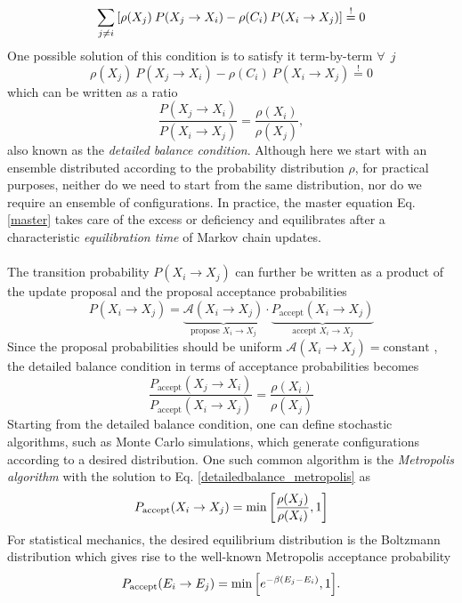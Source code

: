 \documentclass[../thesis_main.tex]{subfiles}
\begin{document}
\begin{equation}
    \sum_{j\neq i} \qty[\rho(X_j) \: P(X_j \to X_i) - \rho(C_i) \: P(X_i \to X_j)] \stackrel{!}{=} 0
\end{equation}  
One possible solution of this condition is to satisfy it term-by-term $\forall \: \: j$ 
\begin{equation}
    \rho(X_j) \: P(X_j \to X_i) - \rho(C_i) \: P(X_i \to X_j) \stackrel{!}{=} 0
\end{equation}
which can be written as a ratio 
\begin{equation}
    \frac{P(X_j \to X_i)}{P(X_i \to X_j)} = \frac{\rho(X_i)}{\rho(X_j)},
    \label{detailedbalance}
\end{equation}
also known as the \textit{detailed balance condition}. Although here we start with an ensemble distributed according to the probability distribution $\rho$, for practical purposes, neither do we need to start from the same distribution, nor do we require an ensemble of configurations. In practice, the master equation Eq. \eqref{master} takes care of the excess or deficiency and equilibrates after a characteristic \textit{equilibration time} of Markov chain updates.~\\~\\
The transition probability $P(X_i \to X_j)$ can further be written as a product of the update proposal and the proposal acceptance probabilities 
\begin{equation}
    P(X_i \to X_j) = \underbrace{\mathcal{A}(X_i \to X_j)}_{\text{propose }X_i \to X_j} \cdot \underbrace{P_\text{accept}(X_i \to X_j)}_{\text{accept }X_i \to X_j}
\end{equation}
Since the proposal probabilities should be uniform $\mathcal{A}(X_i \to X_j) = \text{constant}$ , the detailed balance condition in terms of acceptance probabilities becomes 
\begin{equation}
    \frac{P_\text{accept}(X_j \to X_i)}{P_\text{accept} (X_i \to X_j)} = \frac{\rho(X_i)}{\rho(X_j)}
    \label{detailedbalance_metropolis}
\end{equation}
Starting from the detailed balance condition, one can define stochastic algorithms, such as Monte Carlo simulations, which generate configurations according to a desired distribution. One such common algorithm is the \textit{Metropolis algorithm} with the solution to Eq. \eqref{detailedbalance_metropolis} as 
\begin{equation}
    P_\text{accept}(X_i \to X_j) = \min \qty[\frac{\rho(X_j)}{\rho(X_i)}, 1]
\end{equation}
For statistical mechanics, the desired equilibrium distribution is the Boltzmann distribution which gives rise to the well-known Metropolis acceptance probability
\begin{equation}
    P_\text{accept}(E_i \to E_j) = \min \qty[e^{-\beta(E_j - E_i)}, 1]. 
    \label{metropolis}
\end{equation}
\end{document}
